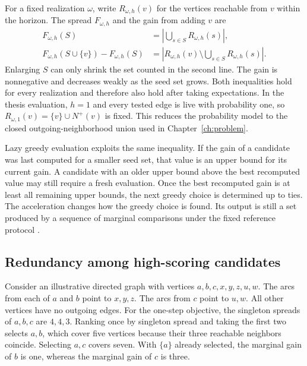 For a fixed realization $\omega$, write $R_{\omega,h}(v)$ for the vertices reachable from $v$ within the horizon. The spread $F_{\omega,h}$ and the gain from adding $v$ are
\begin{align}
 F_{\omega,h}(S)
 &=\left|\bigcup_{s\in S}R_{\omega,h}(s)\right|,\\
 F_{\omega,h}(S\cup\{v\})-F_{\omega,h}(S)
 &=\left|R_{\omega,h}(v)\setminus\bigcup_{s\in S}R_{\omega,h}(s)\right|.
\end{align}
Enlarging $S$ can only shrink the set counted in the second line. The gain is nonnegative and decreases weakly as the seed set grows. Both inequalities hold for every realization and therefore also hold after taking expectations. In the thesis evaluation, $h=1$ and every tested edge is live with probability one, so $R_{\omega,1}(v)=\{v\}\cup N^+(v)$ is fixed. This reduces the probability model to the closed outgoing-neighborhood union used in Chapter~\ref{ch:problem}.

Lazy greedy evaluation exploits the same inequality. If the gain of a candidate was last computed for a smaller seed set, that value is an upper bound for its current gain. A candidate with an older upper bound above the best recomputed value may still require a fresh evaluation. Once the best recomputed gain is at least all remaining upper bounds, the next greedy choice is determined up to ties. The acceleration changes how the greedy choice is found. Its output is still a set produced by a sequence of marginal comparisons under the fixed reference protocol \cite{leskovec2007}.

\subsection{Redundancy among high-scoring candidates}
Consider an illustrative directed graph with vertices $a,b,c,x,y,z,u,w$. The arcs from each of $a$ and $b$ point to $x,y,z$. The arcs from $c$ point to $u,w$. All other vertices have no outgoing edges. For the one-step objective, the singleton spreads of $a,b,c$ are $4,4,3$. Ranking once by singleton spread and taking the first two selects $a,b$, which cover five vertices because their three reachable neighbors coincide. Selecting $a,c$ covers seven. With $\{a\}$ already selected, the marginal gain of $b$ is one, whereas the marginal gain of $c$ is three.

